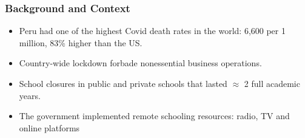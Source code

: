 \documentclass{beamer}
\begin{document}
\begin{frame}
\begin{itemize}

    \end{itemize}
\end{frame}

\begin{frame}
    \label{frame:background}
    \frametitle{Background and Context}
    \begin{itemize}
       \item Peru had one of the highest Covid death rates in the world: 6,600 per 1 million, 83\% higher than the US.
       \item Country-wide lockdown forbade  nonessential business operations.
       \item School closures in public and private schools that lasted $\approx$ 2 full academic years. 
       \item The government implemented remote schooling resources: radio, TV and online platforms
    \end{itemize}
\end{frame}
\end{document}
